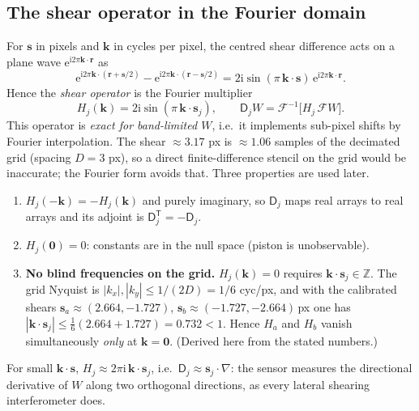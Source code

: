 \documentclass[11pt,a4paper]{article}
\theoremstyle{definition}
\newcommand{\vr}{\bm{r}}
\newcommand{\vk}{\bm{k}}
\newcommand{\vs}{\bm{s}}
\newcommand{\ii}{\mathrm{i}}
\newcommand{\ee}{\mathrm{e}}
\newcommand{\FT}{\mathcal{F}}
\newcommand{\IFT}{\mathcal{F}^{-1}}
\newcommand{\Dop}{\mathsf{D}}
\begin{document}
\subsection{The shear operator in the Fourier domain}
For $\vs$ in pixels and $\vk$ in cycles per pixel, the centred shear difference acts on a plane wave $\ee^{\ii2\pi\vk\cdot\vr}$ as
\begin{equation}
\ee^{\ii2\pi\vk\cdot(\vr+\vs/2)}-\ee^{\ii2\pi\vk\cdot(\vr-\vs/2)}=2\ii\sin(\pi\,\vk\cdot\vs)\,\ee^{\ii2\pi\vk\cdot\vr}.
\label{eq:Hsymbol}
\end{equation}
Hence the \emph{shear operator} is the Fourier multiplier
\begin{equation}
H_j(\vk)=2\ii\sin(\pi\,\vk\cdot\vs_j),\qquad \Dop_jW=\IFT\!\big[H_j\,\FT W\big].
\label{eq:H}
\end{equation}
This operator is \emph{exact for band-limited $W$}, i.e.\ it implements sub-pixel shifts by Fourier interpolation. The shear $\approx3.17$ px is $\approx1.06$ samples of the decimated grid
(spacing $D=3$ px), so a direct finite-difference stencil on the grid would be inaccurate; the Fourier form avoids that.
Three properties are used later.
\begin{enumerate}
\item $H_j(-\vk)=-H_j(\vk)$ and purely imaginary, so $\Dop_j$ maps real arrays to real arrays and its adjoint is $\Dop_j^{\mathsf T}=-\Dop_j$.
\item $H_j(\bm 0)=0$: constants are in the null space (piston is unobservable).
\item \textbf{No blind frequencies on the grid.} $H_j(\vk)=0$ requires $\vk\cdot\vs_j\in\mathbb Z$. The grid Nyquist is $|k_x|,|k_y|\le 1/(2D)=1/6$ cyc/px, and with the calibrated shears
$\vs_a\approx(2.664,-1.727)$, $\vs_b\approx(-1.727,-2.664)$\,px one has $|\vk\cdot\vs_j|\le\tfrac16(2.664+1.727)=0.732<1$. Hence $H_a$ and $H_b$ vanish simultaneously \emph{only} at $\vk=\bm0$.
(Derived here from the stated numbers.)
\end{enumerate}
For small $\vk\cdot\vs$, $H_j\approx2\pi\ii\,\vk\cdot\vs_j$, i.e.\ $\Dop_j\approx\vs_j\!\cdot\!\nabla$: the sensor measures the directional derivative of $W$ along two orthogonal directions, as every lateral shearing interferometer does.
\end{document}

